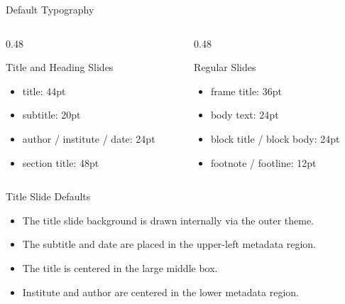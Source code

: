 \documentclass[10pt]{beamer}
\begin{document}
\begin{frame}{Default Typography}
  \begin{columns}[T,totalwidth=\textwidth]
    \begin{column}{0.48\textwidth}
      \begin{block}{Title and Heading Slides}
        \begin{itemize}
          \item title: 44pt
          \item subtitle: 20pt
          \item author / institute / date: 24pt
          \item section title: 48pt
        \end{itemize}
      \end{block}
    \end{column}
    \begin{column}{0.48\textwidth}
      \begin{block}{Regular Slides}
        \begin{itemize}
          \item frame title: 36pt
          \item body text: 24pt
          \item block title / block body: 24pt
          \item footnote / footline: 12pt
        \end{itemize}
      \end{block}
    \end{column}
  \end{columns}
\end{frame}


\begin{frame}{Title Slide Defaults}
  \begin{itemize}
    \item The title slide background is drawn internally via the outer theme.
    \item The subtitle and date are placed in the upper-left metadata region.
    \item The title is centered in the large middle box.
    \item Institute and author are centered in the lower metadata region.
  \end{itemize}
\end{frame}
\end{document}
